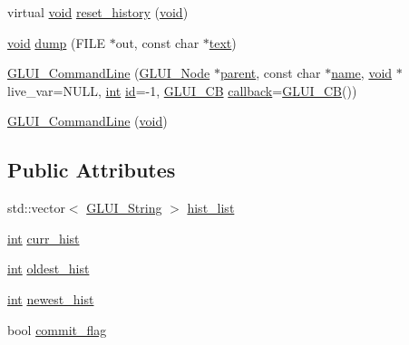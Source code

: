 \begin{DoxyCompactItemize}
\item 
virtual \hyperlink{wglext_8h_a9e6b7f1933461ef318bb000d6bd13b83}{void} \hyperlink{class_g_l_u_i___command_line_a2fcb9cb75a1960fd56c187f940e22938}{reset\+\_\+history} (\hyperlink{wglext_8h_a9e6b7f1933461ef318bb000d6bd13b83}{void})
\item 
\hyperlink{wglext_8h_a9e6b7f1933461ef318bb000d6bd13b83}{void} \hyperlink{class_g_l_u_i___command_line_a89815aca68b849830ba26253135efaf5}{dump} (F\+I\+L\+E $\ast$out, const char $\ast$\hyperlink{class_g_l_u_i___control_af0d60e9736f4dbc34e9a536e75876d72}{text})
\item 
\hyperlink{class_g_l_u_i___command_line_a1367881039ac1384af53f71fa35932b3}{G\+L\+U\+I\+\_\+\+Command\+Line} (\hyperlink{class_g_l_u_i___node}{G\+L\+U\+I\+\_\+\+Node} $\ast$\hyperlink{class_g_l_u_i___node_a8ed65d447784f6f88bd3e2e2bcac6cdb}{parent}, const char $\ast$\hyperlink{glext_8h_ad977737dfc9a274a62741b9500c49a32}{name}, \hyperlink{wglext_8h_a9e6b7f1933461ef318bb000d6bd13b83}{void} $\ast$live\+\_\+var=N\+U\+L\+L, \hyperlink{wglext_8h_a500a82aecba06f4550f6849b8099ca21}{int} \hyperlink{glext_8h_a58c2a664503e14ffb8f21012aabff3e9}{id}=-\/1, \hyperlink{class_g_l_u_i___c_b}{G\+L\+U\+I\+\_\+\+C\+B} \hyperlink{class_g_l_u_i___control_a96060fe0cc6d537e736dd6eef78e24ab}{callback}=\hyperlink{class_g_l_u_i___c_b}{G\+L\+U\+I\+\_\+\+C\+B}())
\item 
\hyperlink{class_g_l_u_i___command_line_ae6c787ef5aa1a8c181eef9ade0c710a1}{G\+L\+U\+I\+\_\+\+Command\+Line} (\hyperlink{wglext_8h_a9e6b7f1933461ef318bb000d6bd13b83}{void})
\end{DoxyCompactItemize}
\subsection*{Public Attributes}
\begin{DoxyCompactItemize}
\item 
std\+::vector$<$ \hyperlink{glui_8h_aada824856f7bcf29794719981ebd8f60}{G\+L\+U\+I\+\_\+\+String} $>$ \hyperlink{class_g_l_u_i___command_line_abc9dcdc275bb36dee1a9db8d348338b5}{hist\+\_\+list}
\item 
\hyperlink{wglext_8h_a500a82aecba06f4550f6849b8099ca21}{int} \hyperlink{class_g_l_u_i___command_line_ab8d88779584003b82000b824ac6f4906}{curr\+\_\+hist}
\item 
\hyperlink{wglext_8h_a500a82aecba06f4550f6849b8099ca21}{int} \hyperlink{class_g_l_u_i___command_line_a689ee6f9ede7c0f6c2060fd5650b1d22}{oldest\+\_\+hist}
\item 
\hyperlink{wglext_8h_a500a82aecba06f4550f6849b8099ca21}{int} \hyperlink{class_g_l_u_i___command_line_af4f50f57b5a239d8564619ec0779518d}{newest\+\_\+hist}
\item 
bool \hyperlink{class_g_l_u_i___command_line_ac2f61fd248c6adb663c6de52e9e431fd}{commit\+\_\+flag}
\end{DoxyCompactItemize}
